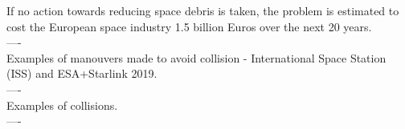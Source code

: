 If no action towards reducing space debris is taken, the problem is estimated to cost the European space industry 1.5 billion Euros over the next 20 years\cite{space_debris_cost}. \\


---- \\

Examples of manouvers made to avoid collision - International Space Station (ISS) and ESA+Starlink 2019. \\

---- \\

Examples of collisions. \\

---- \\






